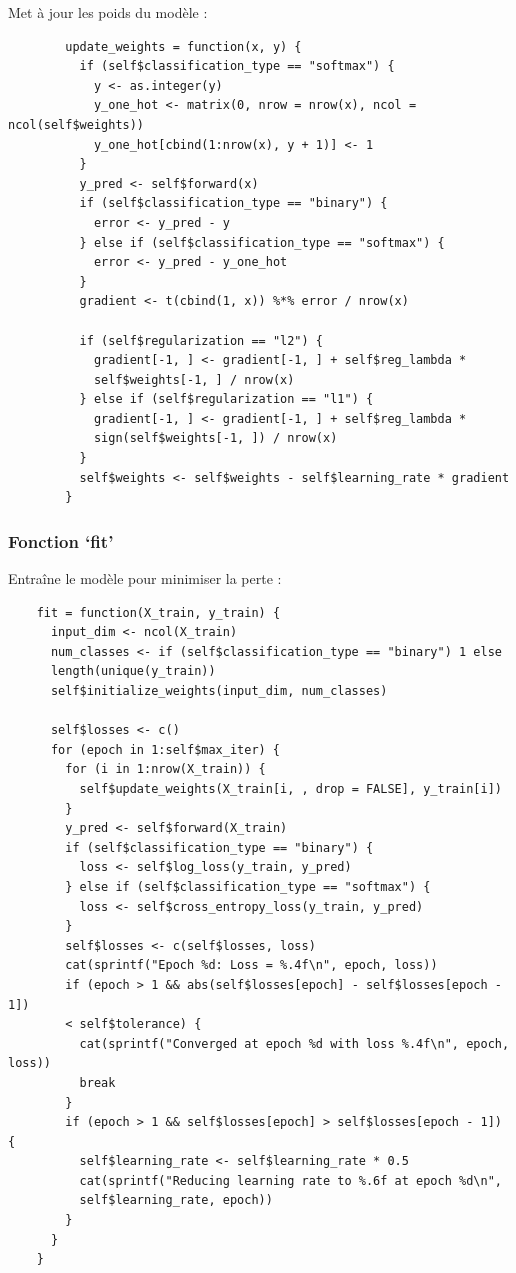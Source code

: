\documentclass[10pt,french]{report}
\begin{document}
    Met à jour les poids du modèle :
    \begin{verbatim}
		update_weights = function(x, y) {
		  if (self$classification_type == "softmax") {
			y <- as.integer(y)
			y_one_hot <- matrix(0, nrow = nrow(x), ncol = ncol(self$weights))
			y_one_hot[cbind(1:nrow(x), y + 1)] <- 1
		  }
		  y_pred <- self$forward(x)
		  if (self$classification_type == "binary") {
			error <- y_pred - y
		  } else if (self$classification_type == "softmax") {
			error <- y_pred - y_one_hot
		  }
		  gradient <- t(cbind(1, x)) %*% error / nrow(x)
	
		  if (self$regularization == "l2") {
			gradient[-1, ] <- gradient[-1, ] + self$reg_lambda * 
			self$weights[-1, ] / nrow(x)
		  } else if (self$regularization == "l1") {
			gradient[-1, ] <- gradient[-1, ] + self$reg_lambda * 
			sign(self$weights[-1, ]) / nrow(x)
		  }
		  self$weights <- self$weights - self$learning_rate * gradient
		}
		\end{verbatim}

    \subsubsection{Fonction \enquote*{fit}}

    Entraîne le modèle pour minimiser la perte :
    \begin{verbatim}
    fit = function(X_train, y_train) {
      input_dim <- ncol(X_train)
      num_classes <- if (self$classification_type == "binary") 1 else 
      length(unique(y_train))
      self$initialize_weights(input_dim, num_classes)

      self$losses <- c()
      for (epoch in 1:self$max_iter) {
        for (i in 1:nrow(X_train)) {
          self$update_weights(X_train[i, , drop = FALSE], y_train[i])
        }
        y_pred <- self$forward(X_train)
        if (self$classification_type == "binary") {
          loss <- self$log_loss(y_train, y_pred)
        } else if (self$classification_type == "softmax") {
          loss <- self$cross_entropy_loss(y_train, y_pred)
        }
        self$losses <- c(self$losses, loss)
        cat(sprintf("Epoch %d: Loss = %.4f\n", epoch, loss))
        if (epoch > 1 && abs(self$losses[epoch] - self$losses[epoch - 1]) 
        < self$tolerance) {
          cat(sprintf("Converged at epoch %d with loss %.4f\n", epoch, loss))
          break
        }
        if (epoch > 1 && self$losses[epoch] > self$losses[epoch - 1]) {
          self$learning_rate <- self$learning_rate * 0.5
          cat(sprintf("Reducing learning rate to %.6f at epoch %d\n", 
          self$learning_rate, epoch))
        }
      }
    }
    \end{verbatim}
\end{document}
